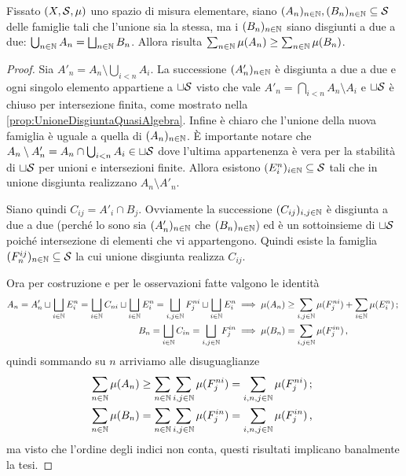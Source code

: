 \begin{lemma}\label{lemma:CoerenzaPremisura}
	Fissato $(X,\S,\mu)$ uno spazio di misura elementare, siano $(A_n)_{n\in\N},(B_n)_{n\in\N}\subseteq\S$ delle famiglie tali che l'unione sia la stessa, ma i $(B_n)_{n\in\N}$ siano disgiunti a due a due: $\bigcup_{n\in\N}A_n=\bigsqcup_{n\in\N}B_n$.
	Allora risulta $\sum_{n\in\N}\mu(A_n)\ge \sum_{n\in\N}\mu(B_n)$.
\end{lemma}
\begin{proof}
	Sia $A'_n=A_n\setminus\bigcup_{i<n}A_i$. La successione $(A'_n)_{n\in\N}$ è disgiunta a due a due e ogni singolo elemento appartiene a $\sqcup \S$ visto che vale $A'_n=\bigcap_{i<n}A_n\setminus A_i$ e $\sqcup \S$ è chiuso per intersezione finita, come mostrato nella \cref{prop:UnioneDisgiuntaQuasiAlgebra}. Infine è chiaro che l'unione della nuova famiglia è uguale a quella di $(A_n)_{n\in\N}$.
	È importante notare che $A_n\setminus A'_n=A_n\cap\bigcup_{i<n}A_i\in\sqcup\S$ dove l'ultima appartenenza è vera per la stabilità di $\sqcup\S$ per unioni e intersezioni finite. Allora esistono $(E^n_i)_{i\in\N}\subseteq\S$ tali che in unione disgiunta realizzano $A_n\setminus A'_n$.
	
	Siano quindi $C_{ij}=A'_i\cap B_j$. Ovviamente la successione $(C_{ij})_{i,j\in\N}$ è disgiunta a due a due (perché lo sono sia $(A'_n)_{n\in\N}$ che $(B_n)_{n\in\N}$) ed è un sottoinsieme di $\sqcup\S$ poiché intersezione di elementi che vi appartengono. Quindi esiste la famiglia $(F^{ij}_n)_{n\in\N}\subseteq\S$ la cui unione disgiunta realizza $C_{ij}$.
	
	Ora per costruzione e per le osservazioni fatte valgono le identità
	\begin{align*}
		A_n= A'_n\sqcup \bigsqcup_{i\in\N}E^n_i=\bigsqcup_{i\in\N}C_{ni}\sqcup \bigsqcup_{i\in\N}E^n_i
		=\bigsqcup_{i,j\in\N}F^{ni}_j\sqcup \bigsqcup_{i\in\N}E^n_i
		&\implies \mu(A_n)\ge\sum_{i,j\in\N}\mu(F^{ni}_j)+\sum_{i\in\N}\mu(E^n_i) \puntovirgola\\
		B_n=\bigsqcup_{i\in\N}C_{in}=\bigsqcup_{i,j\in\N}F^{in}_j
		&\implies \mu(B_n)=\sum_{i,j\in\N}\mu(F^{in}_j) \virgola
	\end{align*}
	quindi sommando su $n$ arriviamo alle disuguaglianze
	\begin{align*}
		\sum_{n\in\N}\mu(A_n)&\ge \sum_{n\in\N}\sum_{i,j\in\N}\mu(F^{ni}_j)
		=\sum_{i,n,j\in\N}\mu(F^{ni}_j) \puntovirgola\\
		\sum_{n\in\N}\mu(B_n)&=\sum_{n\in\N}\sum_{i,j\in\N}\mu(F^{in}_j)=\sum_{i,n,j\in\N}\mu(F^{in}_j) \virgola
	\end{align*}
	ma visto che l'ordine degli indici non conta, questi risultati implicano banalmente la tesi.
\end{proof}



